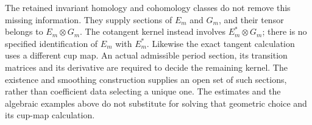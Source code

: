 The retained invariant homology and cohomology classes do not remove
this missing information. They supply sections of $E_m$ and $G_m$,
and their tensor belongs to $E_m\otimes G_m$. The cotangent kernel
instead involves $E_m^*\otimes G_m$; there is no specified identification
of $E_m$ with $E_m^*$. Likewise the exact tangent calculation uses
a different cup map. An actual admissible period section, its transition
matrices and its derivative are required to decide the remaining
kernel. The existence and smoothing construction supplies an open set
of such sections, rather than coefficient data selecting a unique
one. The estimates and the algebraic examples above do not substitute
for solving that geometric choice and its cup-map calculation.
